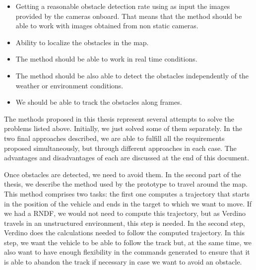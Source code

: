 \begin{itemize}
 \item Getting a reasonable obstacle detection rate using as input the images provided by the cameras onboard. That means that the method should be able to work with images obtained from non static cameras.
 \item Ability to localize the obstacles in the map.
 \item The method should be able to work in real time conditions.
 \item The method should be also able to detect the obstacles independently of the weather or environment conditions.
 \item We should be able to track the obstacles along frames.
\end{itemize}

The methods proposed in this thesis represent several attempts to solve the problems listed above. Initially, we just solved some of them separately. In the two final approaches described, we are able to fulfill all the requirements proposed simultaneously, but through different approaches in each case. The advantages and disadvantages of each are discussed at the end of this document.

Once obstacles are detected, we need to avoid them. In the second part of the thesis, we describe the method used by the prototype to travel around the map. This method comprises two tasks: the first one computes a trajectory that starts in the position of the vehicle and ends in the target to which we want to move. If we had a \ac{RNDF}, we would not need to compute this trajectory, but as Verdino travels in an unstructured environment, this step is needed. In the second step, Verdino does the calculations needed to follow the computed trajectory. In this step, we want the vehicle to be able to follow the track but, at the same time, we also want to have enough flexibility in the commands generated to ensure that it is able to abandon the track if necessary in case we want to avoid an obstacle.


